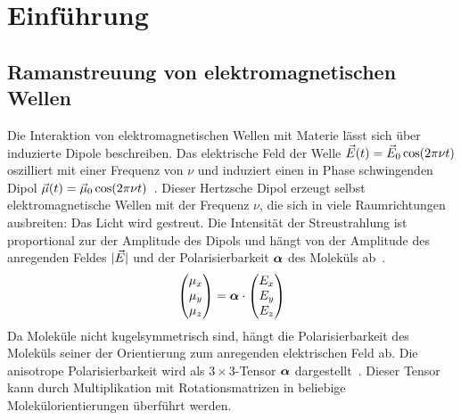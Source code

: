\documentclass[a4paper,12pt,twoside,parskip=no,headsepline,open=right,ngerman,export]{scrreprt}
\begin{document}
    \chapter{Einführung}
        
        \section{Ramanstreuung von elektromagnetischen Wellen}
            
            Die Interaktion von elektromagnetischen Wellen mit Materie lässt sich über induzierte Dipole beschreiben. Das elektrische Feld der Welle $\vec{E}(t) = \vec{E}_0 \cos(2\pi \nu t)$ oszilliert mit einer Frequenz von $\nu$ und induziert einen in Phase schwingenden Dipol $\vec{\mu}(t) = \vec{\mu}_0 \cos(2\pi \nu t)$~\cite{chalmers_raman_2006}. Dieser Hertzsche Dipol erzeugt selbst elektromagnetische Wellen mit der Frequenz $\nu$, die sich in viele Raumrichtungen ausbreiten: Das Licht wird gestreut. Die Intensität der Streustrahlung ist proportional zur der Amplitude des Dipols und hängt von der Amplitude des anregenden Feldes $|\vec{E}|$ und der Polarisierbarkeit $\boldsymbol\alpha$ des Moleküls ab~\cite{wilson_molecular_1955}.
            \begin{equation}
                \begin{pmatrix} \mu_x \\ \mu_y \\ \mu_z \end{pmatrix} 
                    = \boldsymbol\alpha \cdot \begin{pmatrix} E_x \\ E_y \\ E_z \end{pmatrix}
                \label{eq:theo_rayleighDipol}
            \end{equation}
            Da Moleküle nicht kugelsymmetrisch sind, hängt die Polarisierbarkeit des Moleküls seiner der Orientierung zum anregenden elektrischen Feld ab. Die anisotrope Polarisierbarkeit wird als $3\times 3$-Tensor $\boldsymbol\alpha$ dargestellt~\cite{chalmers_raman_2006}. Dieser Tensor kann durch Multiplikation mit Rotationsmatrizen in beliebige Molekülorientierungen überführt werden.
            
\end{document}
